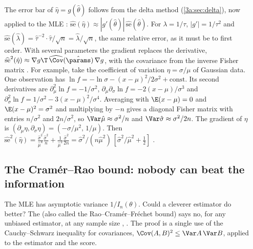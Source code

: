The error bar of $\hat\eta=g(\hat\theta)$ follows from the delta method
(\cref{3a:sec:delta}), now applied to the MLE :
$\widehat{\mathrm{se}}(\hat\eta)\approx|g'(\hat\theta)|\,\widehat{\mathrm{se}}(\hat\theta)$.
For $\lambda=1/\tau$, $|g'|=1/\tau^2$ and
$\widehat{\mathrm{se}}(\hat\lambda)=\hat\tau^{-2}\cdot\hat\tau/\sqrt n=\hat\lambda/\sqrt n$,
the same relative error, as it must be to first order. With several
parameters the gradient replaces the derivative,
$\widehat{\mathrm{se}}^2(\hat\eta)\approx\nabla g\T\,\widehat{\Cov}(\hat\params)\,\nabla g$,
with the covariance from the inverse Fisher matrix
. For example, take the coefficient of variation
$\eta=\sigma/\mu$ of Gaussian data. One observation has
$\ln f=-\ln\sigma-(x-\mu)^2/2\sigma^2+\text{const}$. Its second derivatives
are $\partial^2_\mu\ln f=-1/\sigma^2$, $\partial_\mu\partial_\sigma\ln
f=-2(x-\mu)/\sigma^3$ and $\partial^2_\sigma\ln f=1/\sigma^2-3(x-\mu)^2/\sigma^4$.
Averaging with $\E(x-\mu)=0$ and $\E(x-\mu)^2=\sigma^2$ and multiplying by
$-n$ gives a diagonal Fisher matrix with entries $n/\sigma^2$ and
$2n/\sigma^2$, so $\Var\hat\mu\approx\sigma^2/n$ and
$\Var\hat\sigma\approx\sigma^2/2n$. The gradient of $\eta$ is
$(\partial_\mu\eta,\partial_\sigma\eta)=(-\sigma/\mu^2,\,1/\mu)$. Then
$\widehat{\mathrm{se}}^2(\hat\eta)=\frac{\hat\sigma^2}{\hat\mu^4}\frac{\hat\sigma^2}{n}
+\frac{1}{\hat\mu^2}\frac{\hat\sigma^2}{2n}
=\hat\sigma^2/(n\hat\mu^2)\,[\hat\sigma^2/\hat\mu^2+\tfrac12]$
.

\subsection{The Cram\'er--Rao bound: nobody can beat the information}
\label{3b:sec:cramer-rao}

The MLE has asymptotic variance $1/I_n(\theta)$. Could a cleverer
estimator do better? The  (also called
the Rao--Cram\'er--Fr\'echet bound) says no, for any unbiased estimator,
at any sample size , .
The proof is a single use of the Cauchy--Schwarz inequality for
covariances, $\Cov(A,B)^2\le\Var A\,\Var B$, applied to the estimator and
the score.

